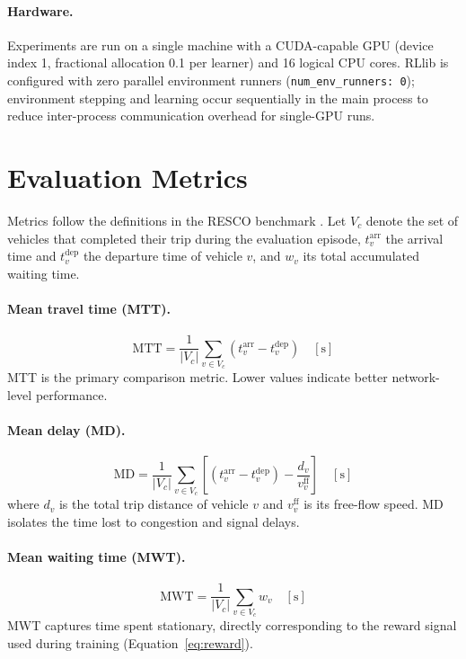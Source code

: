 \paragraph{Hardware.}
Experiments are run on a single machine with a CUDA-capable GPU (device index 1, fractional allocation 0.1 per learner) and 16 logical CPU cores. RLlib is configured with zero parallel environment runners (\texttt{num\_env\_runners: 0}); environment stepping and learning occur sequentially in the main process to reduce inter-process communication overhead for single-GPU runs.

\section{Evaluation Metrics}
\label{sec:ExperimentalDesign_MetricsProcedure}

Metrics follow the definitions in the RESCO benchmark \citep{ault2021reinforcement}. Let $V_c$ denote the set of vehicles that completed their trip during the evaluation episode, $t_v^{\mathrm{arr}}$ the arrival time and $t_v^{\mathrm{dep}}$ the departure time of vehicle $v$, and $w_v$ its total accumulated waiting time.

\paragraph{Mean travel time (MTT).}
\begin{equation}
  \mathrm{MTT} = \frac{1}{|V_c|} \sum_{v \in V_c} \left(t_v^{\mathrm{arr}} - t_v^{\mathrm{dep}}\right) \quad [\mathrm{s}]
  \label{eq:mtt}
\end{equation}
MTT is the primary comparison metric. Lower values indicate better network-level performance.

\paragraph{Mean delay (MD).}
\begin{equation}
  \mathrm{MD} = \frac{1}{|V_c|} \sum_{v \in V_c} \left[\left(t_v^{\mathrm{arr}} - t_v^{\mathrm{dep}}\right) - \frac{d_v}{v_v^{\mathrm{ff}}}\right] \quad [\mathrm{s}]
  \label{eq:delay}
\end{equation}
where $d_v$ is the total trip distance of vehicle $v$ and $v_v^{\mathrm{ff}}$ is its free-flow speed. MD isolates the time lost to congestion and signal delays.

\paragraph{Mean waiting time (MWT).}
\begin{equation}
  \mathrm{MWT} = \frac{1}{|V_c|} \sum_{v \in V_c} w_v \quad [\mathrm{s}]
  \label{eq:mwt}
\end{equation}
MWT captures time spent stationary, directly corresponding to the reward signal used during training (Equation~\ref{eq:reward}).

